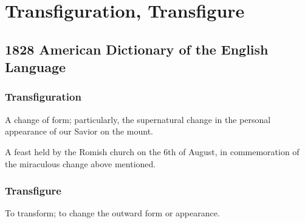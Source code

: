 \section{Transfiguration, Transfigure}
	\label{TRANSFIGURATION}
	

\subsection{1828 American Dictionary of the English Language} %
	\label{TRANSFIGURATION-1828}
	
	\subsubsection{Transfiguration}

		\begin{compactitem}
			\item[1] A change of form; particularly, the supernatural change in the personal appearance of our Savior on the mount.
			\item[2] A feast held by the Romish church on the 6th of August, in commemoration of the miraculous change above mentioned.
		\end{compactitem}
		
	\subsubsection{Transfigure}

		\begin{compactitem}
			\item[1] To transform; to change the outward form or appearance.
		\end{compactitem}


